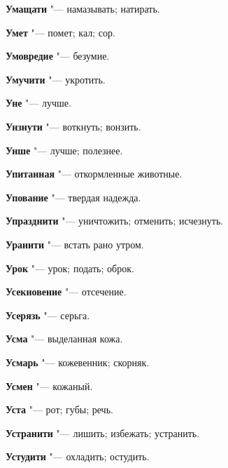 \begin{mymulticols}{2}
\noindent\textbf{Умащати} "--- намазывать; натирать. 




\noindent\textbf{Умет} "--- помет; кал; сор. 




\noindent\textbf{Умовредие} "--- безумие. 




\noindent\textbf{Умучити} "--- укротить. 




\noindent\textbf{Уне} "--- лучше. 




\noindent\textbf{Унзнути} "--- воткнуть; вонзить. 




\noindent\textbf{Унше} "--- лучше; полезнее. 




\noindent\textbf{Упитанная} "--- откормленные животные. 




\noindent\textbf{Упование} "--- твердая надежда. 




\noindent\textbf{Упразднити} "--- уничтожить; отменить; исчезнуть. 




\noindent\textbf{Уранити} "--- встать рано утром. 




\noindent\textbf{Урок} "--- урок; подать; оброк. 




\noindent\textbf{Усекновение} "--- отсечение. 




\noindent\textbf{Усерязь} "--- серьга. 




\noindent\textbf{Усма} "--- выделанная кожа. 




\noindent\textbf{Усмарь} "--- кожевенник; скорняк. 




\noindent\textbf{Усмен} "--- кожаный. 




\noindent\textbf{Уста} "--- рот; губы; речь. 




\noindent\textbf{Устранити} "--- лишить; избежать; устранить. 




\noindent\textbf{Устудити} "--- охладить; остудить. 





\end{mymulticols}
